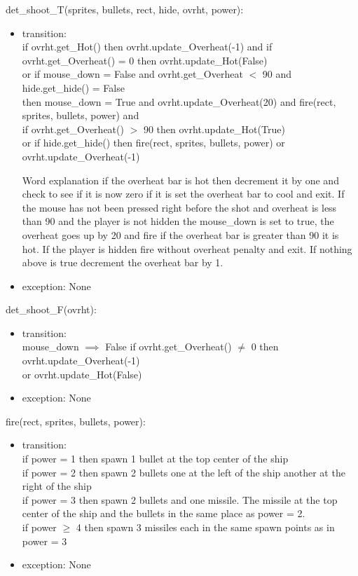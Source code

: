 \documentclass[12pt, titlepage]{article}
\begin{document}
\noindent det\_shoot\_T(sprites, bullets, rect, hide, ovrht, power):
\begin{itemize}
\item transition:\\
if ovrht.get\_Hot() then ovrht.update\_Overheat(-1) and if ovrht.get\_Overheat() = 0 then ovrht.update\_Hot(False)\\
or if mouse\_down = False and ovrht.get\_Overheat $<$ 90 and hide.get\_hide() = False\\ then mouse\_down = True and ovrht.update\_Overheat(20) and fire(rect, sprites, bullets, power) and\\ if ovrht.get\_Overheat() $>$ 90 then ovrht.update\_Hot(True)\\
or if hide.get\_hide() then fire(rect, sprites, bullets, power)
or ovrht.update\_Overheat(-1)

Word explanation
if the overheat bar is hot then decrement it by one and check to see if it is now zero if it is set the overheat bar to cool and exit. If the mouse has not been pressed right before the shot and overheat is less than 90 and the player is not hidden the mouse\_down is set to true, the overheat goes up by 20 and fire if the overheat bar is greater than 90 it is hot. If the player is hidden fire without overheat penalty and exit. If nothing above is true decrement the overheat bar by 1.
\item exception: None
\end{itemize}

\noindent det\_shoot\_F(ovrht):
\begin{itemize}
\item transition:\\
mouse\_down $\implies$ False
if ovrht.get\_Overheat() $\neq$ 0 then ovrht.update\_Overheat(-1)\\
or ovrht.update\_Hot(False)
\item exception: None
\end{itemize}

\noindent fire(rect, sprites, bullets, power):
\begin{itemize}
\item transition:\\
if power = 1 then spawn 1 bullet at the top center of the ship\\
if power = 2 then spawn 2 bullets one at the left of the ship another at the right of the ship\\
if power = 3 then spawn 2 bullets and one missile. The missile at the top center of the ship and the bullets in the same place as power = 2.\\
if power $\geq$ 4 then spawn 3 missiles each in the same spawn points as in power = 3
\item exception: None
\end{itemize}
\end{document}
